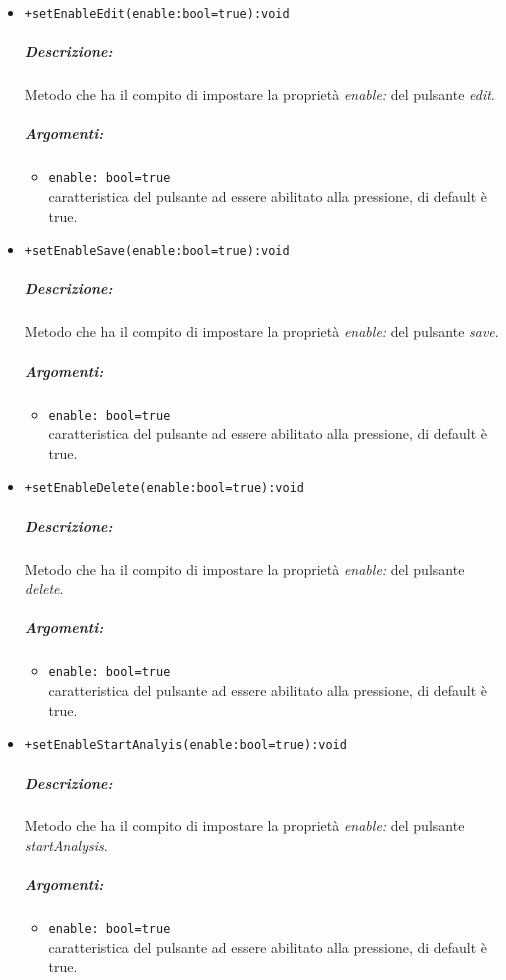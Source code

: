 \begin{itemize}
\item \color{blue}\verb!+setEnableEdit(enable:bool=true):void!
\color{black}
\subparagraph{Descrizione:} Metodo che ha il compito di impostare la proprietà \textit{enable:} del pulsante \textit{edit}.
\subparagraph{Argomenti:}
\begin{itemize}
\item  \color{RoyalPurple} \verb!enable: bool=true !\\ caratteristica del pulsante ad essere abilitato alla pressione, di default è true.
\end{itemize}

\item \color{blue}\verb!+setEnableSave(enable:bool=true):void!
\color{black}
\subparagraph{Descrizione:} Metodo che ha il compito di impostare la proprietà \textit{enable:} del pulsante \textit{save}.
\subparagraph{Argomenti:}
\begin{itemize}
\item  \color{RoyalPurple} \verb!enable: bool=true !\\ caratteristica del pulsante ad essere abilitato alla pressione, di default è true.
\end{itemize}

\item \color{blue}\verb!+setEnableDelete(enable:bool=true):void!
\color{black}
\subparagraph{Descrizione:} Metodo che ha il compito di impostare la proprietà \textit{enable:} del pulsante \textit{delete}.
\subparagraph{Argomenti:}
\begin{itemize}
\item  \color{RoyalPurple} \verb!enable: bool=true !\\ caratteristica del pulsante ad essere abilitato alla pressione, di default è true.
\end{itemize}

\item \color{blue}\verb!+setEnableStartAnalyis(enable:bool=true):void!
\color{black}
\subparagraph{Descrizione:} Metodo che ha il compito di impostare la proprietà \textit{enable:} del pulsante \textit{startAnalysis}.
\subparagraph{Argomenti:}
\begin{itemize}
\item  \color{RoyalPurple} \verb!enable: bool=true !\\ caratteristica del pulsante ad essere abilitato alla pressione, di default è true.
\end{itemize}


\end{itemize}
